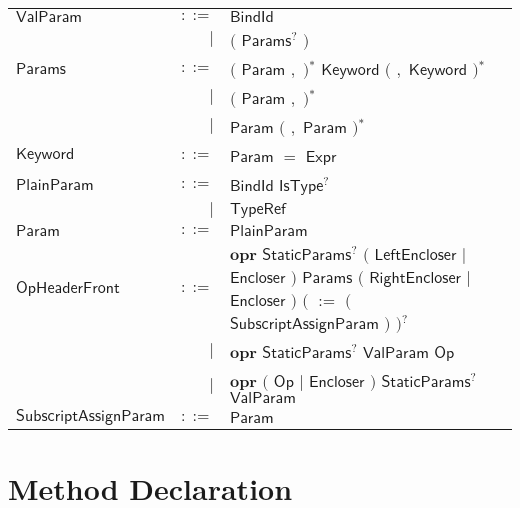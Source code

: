  
\begin{longtable}[l]{p{3cm}rl}
$\mathsf{ValParam}$ &  $\mathsf{::=}$  & $\mathsf{BindId}$ \\
 & $\big|$ &  $\big($  $\mathsf{Params}$$^?$ $\big)$ \\
$\mathsf{Params}$ &  $\mathsf{::=}$  & $\big($  $\mathsf{Param}$ $\mathbf{,}$ $\big)$$^*$ $\mathsf{Keyword}$ $\big($  $\mathbf{,}$ $\mathsf{Keyword}$ $\big)$$^*$ \\
 & $\big|$ &  $\big($  $\mathsf{Param}$ $\mathbf{,}$ $\big)$$^*$ \\
 & $\big|$ &  $\mathsf{Param}$ $\big($  $\mathbf{,}$ $\mathsf{Param}$ $\big)$$^*$ \\
$\mathsf{Keyword}$ &  $\mathsf{::=}$  & $\mathsf{Param}$ $\mathbf{=}$ $\mathsf{Expr}$ \\
$\mathsf{PlainParam}$ &  $\mathsf{::=}$  & $\mathsf{BindId}$ $\mathsf{IsType}$$^?$ \\
 & $\big|$ &  $\mathsf{TypeRef}$ \\
$\mathsf{Param}$ &  $\mathsf{::=}$  & $\mathsf{PlainParam}$ \\
$\mathsf{OpHeaderFront}$ &  $\mathsf{::=}$  & $\mathbf{opr}$ $\mathsf{StaticParams}$$^?$ $\big($  $\mathsf{LeftEncloser}$ $\big|$ $\mathsf{Encloser}$ $\big)$ $\mathsf{Params}$ $\big($  $\mathsf{RightEncloser}$ $\big|$ $\mathsf{Encloser}$ $\big)$ $\big($  $\mathbf{:=}$ $\big($  $\mathsf{SubscriptAssignParam}$ $\big)$ $\big)$$^?$ \\
 & $\big|$ &  $\mathbf{opr}$ $\mathsf{StaticParams}$$^?$ $\mathsf{ValParam}$ $\mathsf{Op}$ \\
 & $\big|$ &  $\mathbf{opr}$ $\big($  $\mathsf{Op}$ $\big|$ $\mathsf{Encloser}$ $\big)$ $\mathsf{StaticParams}$$^?$ $\mathsf{ValParam}$ \\
$\mathsf{SubscriptAssignParam}$ &  $\mathsf{::=}$  & $\mathsf{Param}$ \\
\end{longtable} \hfill 

\section{Method Declaration} 

